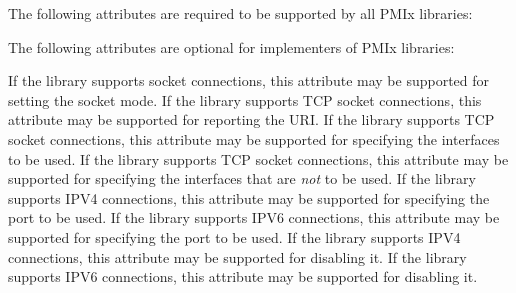 {\begin{arglist}
\end{arglist}

\returnsimple

\reqattrstart
The following attributes are required to be supported by all \ac{PMIx} libraries:


\reqattrend

\optattrstart
The following attributes are optional for implementers of \ac{PMIx} libraries:

 If the library supports socket connections, this attribute may be supported for setting the socket mode.
\pasteAttributeItemEnd{}
 If the library supports TCP socket connections, this attribute may be supported for reporting the URI.
\pasteAttributeItemEnd{}
 If the library supports TCP socket connections, this attribute may be supported for specifying the interfaces to be used.
\pasteAttributeItemEnd{}
 If the library supports TCP socket connections, this attribute may be supported for specifying the interfaces that are \textit{not} to be used.
\pasteAttributeItemEnd{}
 If the library supports IPV4 connections, this attribute may be supported for specifying the port to be used.
\pasteAttributeItemEnd{}
 If the library supports IPV6 connections, this attribute may be supported for specifying the port to be used.
\pasteAttributeItemEnd{}
 If the library supports IPV4 connections, this attribute may be supported for disabling it.
\pasteAttributeItemEnd{}
 If the library supports IPV6 connections, this attribute may be supported for disabling it.
\pasteAttributeItemEnd{}

}
